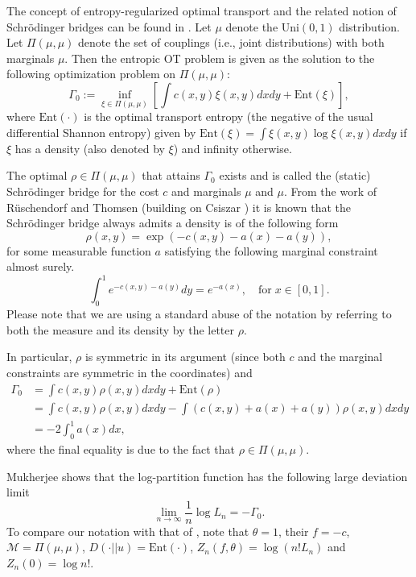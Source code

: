 \documentclass{amsart}
\newcommand{\Ent}{\mathrm{Ent}}
\begin{document}
The concept of entropy-regularized optimal transport and the related notion of Schr\"odinger bridges can be found in \cite{L12}.  Let $\mu$ denote the Uni$(0,1)$ distribution. Let $\Pi(\mu, \mu)$ denote the set of couplings (i.e., joint distributions) with both marginals $\mu$. Then the entropic OT problem is given as the solution to the following optimization problem on $\Pi(\mu, \mu)$: 
\begin{equation}\label{eq:entropicot}
\Gamma_0:=\inf_{\xi \in \Pi(\mu, \mu)} \left[ \int c(x,y) \xi(x,y) dxdy + \Ent(\xi) \right], 
\end{equation}
where $\Ent(\cdot)$ is the optimal transport entropy (the negative of the usual differential Shannon entropy) given by $\Ent(\xi)= \int \xi(x,y) \log \xi(x,y) dxdy$ if $\xi$ has a density (also denoted by $\xi$) and infinity otherwise. 

The optimal $\rho\in \Pi(\mu, \mu)$ that attains $\Gamma_0$ exists and is called the (static) Schr\"odinger bridge for the cost $c$ and marginals $\mu$ and $\mu$. From the work of R\"uschendorf and Thomsen \cite{RT93} (building on Csiszar \cite{C75}) it is known that the Schr\"odinger bridge always admits a density is of the following form 
\begin{equation}\label{eq:schrodingerform}
\rho(x,y) = \exp\left( - c(x,y) - a(x) - a(y) \right),
\end{equation}
for some measurable function $a$ satisfying the following marginal constraint almost surely.
\begin{equation}\label{eq:marginalconstraint}
 \int_0^1 e^{- c(x,y) - a(y)}  dy=e^{-a(x)}, \quad \text{for}\;  x\in [0,1]. 
\end{equation}
Please note that we are using a standard abuse of the notation by referring to both the measure and its density by the letter $\rho$.

In particular, $\rho$ is symmetric in its argument (since both $c$ and the marginal constraints are symmetric in the coordinates) and 
\[
\begin{split}
\Gamma_0 &=  \int c(x,y) \rho(x,y) dxdy + \Ent(\rho) \\
&= \int c(x,y) \rho(x,y) dxdy - \int \left( c(x,y) + a(x) + a(y) \right) \rho(x,y)dxdy\\
&= - 2 \int_0^1 a(x)dx,
\end{split}
\]
where the final equality is due to the fact that $\rho \in \Pi(\mu, \mu)$. 

Mukherjee \cite[Theorem 1.5]{Mukherjee16} shows that the log-partition function has the following large deviation limit
\[
\lim_{n\rightarrow \infty}\frac{1}{n} \log L_n = -\Gamma_0. 
\]
To compare our notation with that of \cite{Mukherjee16}, note that $\theta=1$, their $f=-c$, $\mathcal{M}=\Pi(\mu, \mu)$, $D(\cdot || u)= \Ent(\cdot)$, $Z_n(f, \theta)=\log (n! L_n)$ and $Z_n(0)=\log n!$. 
\end{document}
